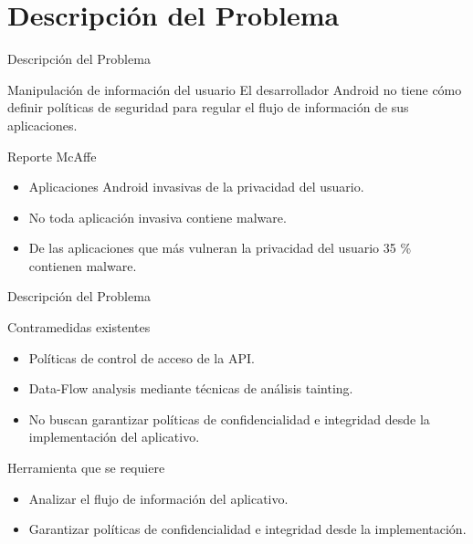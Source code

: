  \section{Descripción del Problema}
	
\begin{frame}{Descripción del Problema}
	\begin{block}{Manipulación de información del usuario}
	El desarrollador Android no tiene cómo definir políticas de seguridad para
	regular el flujo de información de sus aplicaciones.
	\end{block}
	\pause
	\begin{block}{ Reporte McAffe}
		\begin{itemize}
	  	\item Aplicaciones Android invasivas de la privacidad del usuario.
	  	\item No toda aplicación invasiva contiene malware.
	  	\item De las aplicaciones que más vulneran la privacidad del usuario 35 \%
	  	contienen malware.
		\end{itemize}
	\end{block}
\end{frame}

\begin{frame}{Descripción del Problema}
	\begin{block}{Contramedidas existentes}
		\begin{itemize}
		  \item Políticas de control de acceso de la API.
		  \item Data-Flow analysis mediante técnicas de análisis tainting.
		   \item No buscan garantizar políticas de confidencialidad e integridad desde
		   la implementación del aplicativo.
		\end{itemize}
	\end{block}
	\pause
	\begin{block}{Herramienta que se requiere}
		\begin{itemize}
		  \item Analizar el flujo de información del aplicativo.
		  \item Garantizar políticas de confidencialidad e integridad desde la
		  implementación.
		\end{itemize}
	\end{block}
\end{frame}